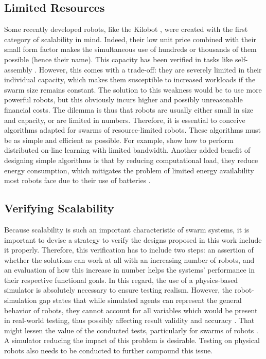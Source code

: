 \subsection{Limited Resources}
Some recently developed robots, like the Kilobot \cite{rubenstein2012kilobot}, were created with the first category of scalability in mind. Indeed, their low unit price combined with their small form factor makes the simultaneous use of hundreds or thousands of them possible (hence their name). This capacity has been verified in tasks like self-assembly \cite{rubenstein2014programmable}. However, this comes with a trade-off: they are severely limited in their individual capacity, which makes them susceptible to increased workloads if the swarm size remains constant. The solution to this weakness would be to use more powerful robots, but this obviously incurs higher and possibly unreasonable financial costs. The dilemma is thus that robots are usually either small in size and capacity, or are limited in numbers. Therefore, it is essential to conceive algorithms adapted for swarms of resource-limited robots. These algorithms must be as simple and efficient as possible. For example, \cite{fontbonne2020distributed} show how to perform distributed on-line learning with limited bandwidth. Another added benefit of designing simple algorithms is that by reducing computational load, they reduce energy consumption, which mitigates the problem of limited energy availability most robots face due to their use of batteries \cite{yang2018grand}.

\subsection{Verifying Scalability}
Because scalability is such an important characteristic of swarm systems, it is important to devise a strategy to verify the designs proposed in this work include it properly. Therefore, this verification has to include two steps: an assertion of whether the solutions can work at all with an increasing number of robots, and an evaluation of how this increase in number helps the systems' performance in their respective functional goals. In this regard, the use of a physics-based simulator is absolutely necessary to ensure testing realism. However, the robot-simulation gap states that while simulated agents can represent the general behavior of robots, they cannot account for all variables which would be present in real-world testing, thus possibly affecting result validity and accuracy  \cite{jakobi1995noise}. That might lessen the value of the conducted tests, particularly for swarms of robots \cite{francesca2016automatic}. A simulator reducing the impact of this problem is desirable. Testing on physical robots also needs to be conducted to further compound this issue.


